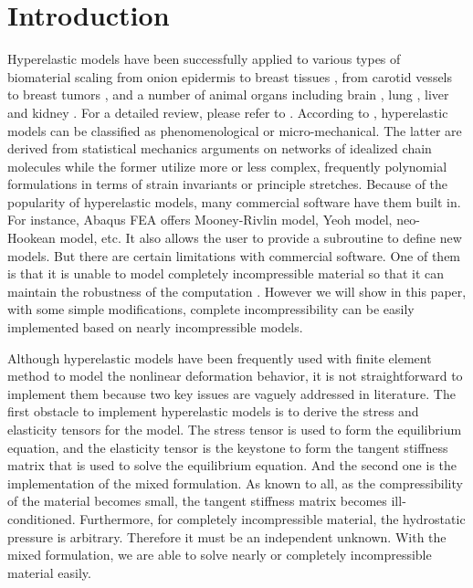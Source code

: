 \section{Introduction}
Hyperelastic models have been successfully applied to various types of biomaterial scaling from onion epidermis \cite{Qian} to breast tissues \cite{OHagen}, from carotid vessels \cite{Zidi, Zidi2, Bols} to breast tumors \cite{Oberai}, and a number of animal organs including brain \cite{Karimi, Samani, Gilchrist}, lung  \cite{Wall, Wall2}, liver and kidney \cite{Fu, Untaroiu, Willinger}. For a detailed review, please refer to \cite{Kupriyanova}.
According to \cite{Steinmann}, hyperelastic models can be classified as phenomenological or micro-mechanical. The latter are derived from statistical mechanics arguments on networks of idealized chain molecules while the former utilize more or less complex, frequently polynomial formulations in terms of strain invariants or principle stretches. Because of the popularity of hyperelastic models, many commercial software have them built in. For instance, Abaqus FEA offers Mooney-Rivlin model, Yeoh model, neo-Hookean model, etc. It also allows the user to provide a subroutine to define new models. But there are certain limitations with commercial software. One of them is that it is unable to model completely incompressible material so that it can maintain the robustness of the computation \cite{Abaqus}. However we will show in this paper, with some simple modifications, complete incompressibility can be easily implemented based on nearly incompressible models.

Although hyperelastic models have been frequently used with finite element method to model the nonlinear deformation behavior, it is not straightforward to implement them because two key issues are vaguely addressed in literature. The first obstacle to implement hyperelastic models is to derive the stress and elasticity tensors for the model. The stress tensor is used to form the equilibrium equation, and the elasticity tensor is the keystone to form the tangent stiffness matrix that is used to solve the equilibrium equation. And the second one is the implementation of the mixed formulation. As known to all, as the compressibility of the material becomes small, the tangent stiffness matrix becomes ill-conditioned. Furthermore, for completely incompressible material, the hydrostatic pressure is arbitrary. Therefore it must be an independent unknown. With the mixed formulation, we are able to solve nearly or completely incompressible material easily. 

